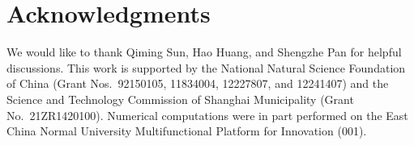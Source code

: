 \documentclass[preprint,12pt]{elsarticle} %
\begin{document}
\section*{Acknowledgments}

We would like to thank Qiming Sun, Hao Huang, and Shengzhe Pan for helpful discussions.
This work is supported by the National Natural Science Foundation of China (Grant Nos.\ 92150105, 11834004, 12227807, and 12241407) and the Science and Technology Commission of Shanghai Municipality (Grant No.\ 21ZR1420100).
Numerical computations were in part performed on the East China Normal University Multifunctional Platform for Innovation (001).



\end{document}
